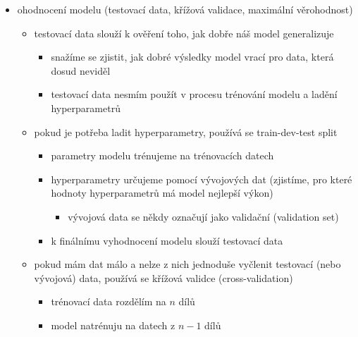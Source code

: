 \begin{itemize}
\begin{itemize}
\begin{itemize}
\begin{itemize}
\end{itemize}
\item senzitivita \dots{} true positive rate (recall)
\begin{itemize}
\item pravděpodobnost pozitivního výsledku u pozitivního (nemocného) jedince
\end{itemize}
\item specificita \dots{} true negative rate
\begin{itemize}
\item pravděpodobnost negativního výsledku u negativního (zdravého) jedince
\end{itemize}
\end{itemize}
\end{itemize}
\item ohodnocení modelu (testovací data, křížová validace, maximální věrohodnost)
\begin{itemize}
\item testovací data slouží k ověření toho, jak dobře náš model generalizuje
\begin{itemize}
\item snažíme se zjistit, jak dobré výsledky model vrací pro data, která dosud neviděl
\item testovací data nesmím použít v procesu trénování modelu a ladění hyperparametrů
\end{itemize}
\item pokud je potřeba ladit hyperparametry, používá se train-dev-test split
\begin{itemize}
\item parametry modelu trénujeme na trénovacích datech
\item hyperparametry určujeme pomocí vývojových dat (zjistíme, pro které hodnoty hyperparametrů má model nejlepší výkon)
\begin{itemize}
\item vývojová data se někdy označují jako validační (validation set)
\end{itemize}
\item k finálnímu vyhodnocení modelu slouží testovací data
\end{itemize}
\item pokud mám dat málo a nelze z nich jednoduše vyčlenit testovací (nebo vývojová) data, používá se křížová validce (cross-validation)
\begin{itemize}
\item trénovací data rozdělím na $n$ dílů
\item model natrénuju na datech z $n-1$ dílů

\end{itemize}
\end{itemize}
\end{itemize}
